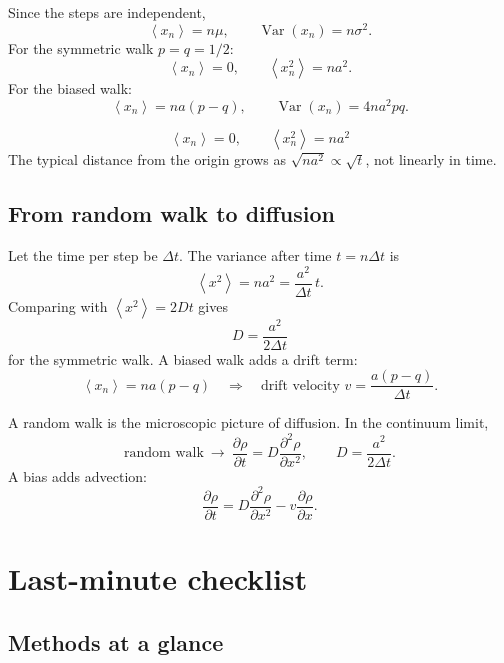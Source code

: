 \documentclass[10.5pt,a4paper]{article}
\newcommand{\avg}[1]{\left\langle #1 \right\rangle}
\begin{document}
\begin{derivbox}
Since the steps are independent,
\[
\avg{x_n}=n\mu,
\qquad
\operatorname{Var}(x_n)=n\sigma^2.
\]
For the symmetric walk \(p=q=1/2\):
\[
\avg{x_n}=0,
\qquad
\avg{x_n^2}=na^2.
\]
For the biased walk:
\[
\avg{x_n}=na(p-q),
\qquad
\operatorname{Var}(x_n)=4na^2pq.
\]
\end{derivbox}

\begin{keybox}
\[
\boxed{\;\avg{x_n}=0,\qquad \avg{x_n^2}=na^2\;}
\]
The typical distance from the origin grows as
\(\sqrt{na^2}\propto\sqrt{t}\), not linearly in time.
\end{keybox}

\subsection{From random walk to diffusion}

Let the time per step be \(\Delta t\). The variance after time
\(t=n\Delta t\) is
\[
\avg{x^2}=na^2=\frac{a^2}{\Delta t}\,t.
\]
Comparing with \(\avg{x^2}=2Dt\) gives
\[
\boxed{\;D=\frac{a^2}{2\Delta t}\;}
\]
for the symmetric walk. A biased walk adds a drift term:
\[
\avg{x_n}=n a(p-q)
\quad\Longrightarrow\quad
\text{drift velocity }v=\frac{a(p-q)}{\Delta t}.
\]

\begin{keybox}
A random walk is the microscopic picture of diffusion. In the continuum
limit,
\[
\text{random walk}\ \longrightarrow\
\frac{\partial\rho}{\partial t}=D\frac{\partial^2\rho}{\partial x^2},
\qquad
D=\frac{a^2}{2\Delta t}.
\]
A bias adds advection:
\[
\frac{\partial\rho}{\partial t}
=D\frac{\partial^2\rho}{\partial x^2}
-v\frac{\partial\rho}{\partial x}.
\]
\end{keybox}

\clearpage
\section*{Last-minute checklist}

\subsection*{Methods at a glance}
\end{document}
